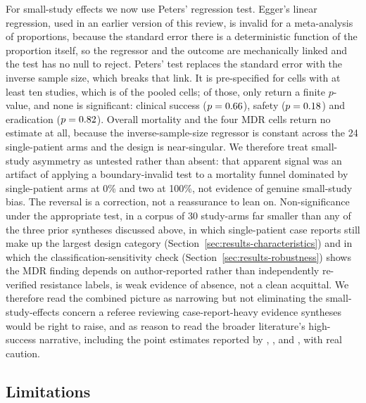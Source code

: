 For small-study effects we now use Peters' regression test. Egger's linear regression, used in an earlier version of this review, is invalid for a meta-analysis of proportions, because the standard error there is a deterministic function of the proportion itself, so the regressor and the outcome are mechanically linked and the test has no null to reject. Peters' test replaces the standard error with the inverse sample size, which breaks that link. It is pre-specified for cells with at least ten studies, which is \PetersEligible of the \PetersCellsTotal pooled cells; of those, only \PetersFinite return a finite $p$-value, and none is significant: clinical success ($p=0.66$), safety ($p=0.18$) and eradication ($p=0.82$). Overall mortality and the four MDR cells return no estimate at all, because the inverse-sample-size regressor is constant across the 24 single-patient arms and the design is near-singular. We therefore treat small-study asymmetry as untested rather than absent: that apparent signal was an artifact of applying a boundary-invalid test to a mortality funnel dominated by single-patient arms at 0\% and two at 100\%, not evidence of genuine small-study bias. The reversal is a correction, not a reassurance to lean on. Non-significance under the appropriate test, in a corpus of 30 study-arms far smaller than any of the three prior syntheses discussed above, in which single-patient case reports still make up the largest design category (Section~\ref{sec:results-characteristics}) and in which the classification-sensitivity check (Section~\ref{sec:results-robustness}) shows the MDR finding depends on author-reported rather than independently re-verified resistance labels, is weak evidence of absence, not a clean acquittal. We therefore read the combined picture as narrowing but not eliminating the small-study-effects concern a referee reviewing case-report-heavy evidence syntheses would be right to raise, and as reason to read the broader literature's high-success narrative, including the point estimates reported by \textcite{ElHaddad2019_eskape}, \textcite{Uyttebroek2022_lancetid}, and \textcite{Liu2025_ijaa}, with real caution.

\subsection{Limitations}
\label{sec:discussion-limitations}

